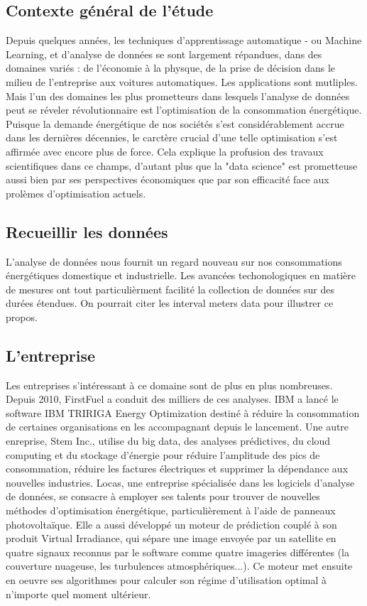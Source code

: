 \documentclass[a4paper]{article}
\begin{document}
\begin{multicols}{2}
\subsection{Contexte général de l'étude}
Depuis quelques années, les techniques d’apprentissage automatique - ou Machine Learning, et d’analyse de données se sont largement répandues, dans des domaines variés : de l’économie à la physque, de la prise de décision dans le milieu de l’entreprise aux voitures automatiques. Les applications sont mutliples. Mais l’un des domaines les plus prometteurs dans lesquels l’analyse de données peut se réveler révolutionnaire est l’optimisation de la consommation énergétique. Puisque la demande énergétique de nos sociétés s’est considérablement accrue dans les dernières décennies, le carctère crucial d’une telle optimisation s’est affirmée avec encore plus de force. Cela explique la profusion des travaux scientifiques dans ce champs, d’autant plus que la "data science" est prometteuse aussi bien par ses perspectives économiques que par son efficacité face aux prolèmes d’optimisation actuels.

\subsection{Recueillir les données}
L’analyse de données nous fournit un regard nouveau sur nos consommations énergétiques domestique et industrielle. Les avancées techonologiques en matière de mesures ont tout particulièrment facilité la collection de données sur des durées étendues. On pourrait citer les interval meters data pour illustrer ce propos.

\subsection{L’entreprise}

Les entreprises s’intéressant à ce domaine sont de plus en plus nombreuses. Depuis 2010, FirstFuel a conduit des milliers de ces analyses. IBM a lancé le software IBM TRIRIGA Energy Optimization destiné à réduire la consommation de certaines organisations en les accompagnant depuis le lancement. Une autre enreprise, Stem Inc., utilise du big data, des analyses prédictives, du cloud computing et du stockage d’énergie pour réduire l’amplitude des pics de consommation, réduire les factures électriques et supprimer la dépendance aux nouvelles industries.
Locas, une entreprise spécialisée dans les logiciels d’analyse de données, se consacre à employer ses talents pour trouver de nouvelles méthodes d’optimisation énergétique, particulièrement à l’aide de panneaux photovoltaïque. Elle a aussi développé un moteur de prédiction couplé à son produit Virtual Irradiance, qui sépare une image envoyée par un satellite en quatre signaux reconnus par le software comme quatre imageries différentes (la couverture nuageuse, les turbulences atmosphériques...). Ce moteur met ensuite en oeuvre ses algorithmes pour calculer son régime d’utilisation optimal à n’importe quel moment ultérieur.


\end{multicols}
\end{document}
